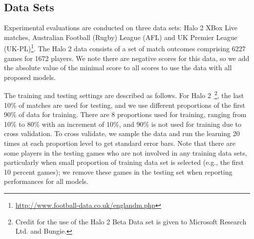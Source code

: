 \subsection{Data Sets}

\label{sec:data_sets}

Experimental evaluations are conducted on three data sets: Halo 2 XBox Live
matches, Australian Football
(Rugby) League (AFL)%
and UK
Premier League (UK-PL)\footnote{\noindent \url{http://www.football-data.co.uk/englandm.php}}.  The Halo 2 data consists of a
set of match outcomes comprising 6227 games for 1672 players. We note there are negative scores for this data, so we add the absolute value of the minimal score to all scores to use the data with all proposed models.

The training and testing settings are described as follows.  For Halo
2~\footnote{\noindent Credit for the use of the Halo 2 Beta Data set
is given to Microsoft Research Ltd. and Bungie.}, the last 10\%
of matches are used for testing, and we use different proportions of
the first 90\% of data for training. There are 8 proportions used
for training, ranging from 10\% to 80\% with an increment of
10\%, and 90\% is not used for training due to cross validation. To cross validate, we sample the data and run the learning 20 times at each proportion level
to get standard error bars. Note that there are some players in the
testing games who are not involved in any training data sets,
particularly when small proportion of training data set is selected
(e.g., the first 10 percent games); we remove these games in the
testing set when reporting performances for all models.



